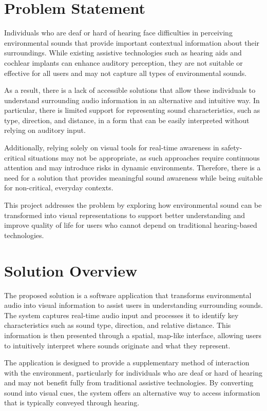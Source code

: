 \section{Problem Statement}
\label{section:problem-statement}

Individuals who are deaf or hard of hearing face difficulties in perceiving environmental sounds that provide important contextual information about their surroundings. 
While existing assistive technologies such as hearing aids and cochlear implants can enhance auditory perception, 
they are not suitable or effective for all users and may not capture all types of environmental sounds.

As a result, there is a lack of accessible solutions that allow these individuals to understand surrounding audio information in an alternative and intuitive way. 
In particular, there is limited support for representing sound characteristics, such as type, direction, and distance, 
in a form that can be easily interpreted without relying on auditory input.

Additionally, relying solely on visual tools for real-time awareness in safety-critical situations may not be appropriate, 
as such approaches require continuous attention and may introduce risks in dynamic environments. 
Therefore, there is a need for a solution that provides meaningful sound awareness while being suitable for non-critical, 
everyday contexts.

This project addresses the problem by exploring how environmental sound can be transformed into visual representations 
to support better understanding and improve quality of life for users who cannot depend on traditional hearing-based technologies.

\section{Solution Overview}
\label{section:solution-overview}

The proposed solution is a software application that transforms environmental audio into visual information to assist users in understanding surrounding sounds. 
The system captures real-time audio input and processes it to identify key characteristics such as sound type, direction, 
and relative distance. This information is then presented through a spatial, map-like interface, 
allowing users to intuitively interpret where sounds originate and what they represent.

The application is designed to provide a supplementary method of interaction with the environment, 
particularly for individuals who are deaf or hard of hearing and may not benefit fully from traditional assistive technologies. 
By converting sound into visual cues, the system offers an alternative way to access information that is typically conveyed through hearing.

